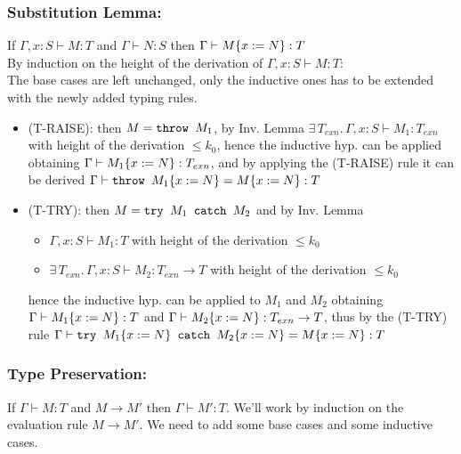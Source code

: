 \subsubsection*{Substitution Lemma:}

If \(\Gamma, x: S \vdash M: T\) and \(\Gamma \vdash N: S\) then
\(\Gamma \vdash M\{x:=N\}: T\)\\ By induction on the height of the
derivation of \(\Gamma, x: S \vdash M: T\):\\ The base cases are left
unchanged, only the inductive ones has to be extended with the newly
added typing rules.
\begin{itemize}
\item (T-RAISE): then \(M = \texttt{throw }M_1\), by Inv. Lemma \(\exists\,
  T_{exn}.\, \Gamma, x: S \vdash M_1: T_{exn}\) with height of the
  derivation \(\le k_0\), hence the inductive hyp. can be applied
  obtaining \(\Gamma \vdash M_1\{x:=N\}: T_{exn}\), and by
  applying the (T-RAISE) rule it can be derived \(\Gamma \vdash
  \texttt{throw }M_1\{x:=N\} = M\{x:=N\}: T\)
\item (T-TRY): then \(M = \texttt{try }M_1\texttt{ catch }M_2\) and by Inv. Lemma
  \begin{itemize}
  \item \(\Gamma, x: S \vdash M_1: T\) with height of the derivation
    \(\le k_0\)
  \item \(\exists\, T_{exn}.\, \Gamma, x: S \vdash M_2: T_{exn} \to
    T\) with height of the derivation \(\le k_0\)
  \end{itemize}
  hence the inductive hyp. can be applied to \(M_1\) and
  \(M_2\) obtaining \(\Gamma \vdash M_1\{x:=N\}: T\)
  and \(\Gamma \vdash M_2\{x:=N\}: T_{exn} \to T\),
  thus by the (T-TRY) rule \(\Gamma \vdash
  \texttt{try }M_1\{x:=N\}\texttt{ catch }M_2\{x:=N\} = M\{x:=N\}:
  T\)
\end{itemize}

\subsubsection*{Type Preservation:}

If \(\Gamma \vdash M: T\) and \(M \to M'\) then \(\Gamma \vdash M':
T\). We'll work by induction on the evaluation rule \(M \to M'\). We
need to add some base cases and some inductive cases.


